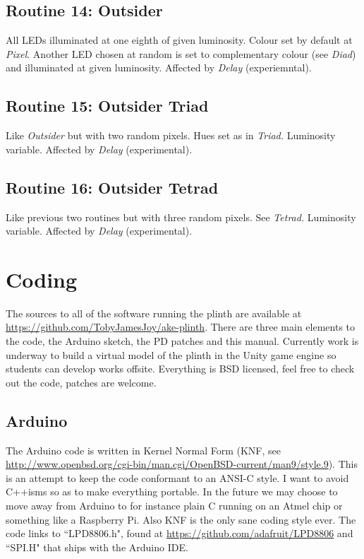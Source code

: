 \documentclass{article}
\begin{document}
	\subsection{Routine 14: Outsider}
	All LEDs illuminated at one eighth of given luminosity. Colour set by 
	default at \emph{Pixel}. Another LED chosen at random is set to 
	complementary colour (see \emph{Diad}) and illuminated at given luminosity. 
	Affected by \emph{Delay} (experiemntal).

	\subsection{Routine 15: Outsider Triad}
	Like \emph{Outsider} but with two random pixels. Hues set as in 
	\emph{Triad.} Luminosity variable. Affected by \emph{Delay} (experimental).

	\subsection{Routine 16: Outsider Tetrad}
	Like previous two routines but with three random pixels. See \emph{Tetrad.} 
	Luminosity variable. Affected by \emph{Delay} (experimental).

	\section{Coding}
	The sources to all of the software running the plinth are available at 
	\url{https://github.com/TobyJamesJoy/ake-plinth}. There are three main 
	elements to the code, the Arduino sketch, the PD patches and this manual. 
	Currently work is underway to build a virtual model of the plinth in the 
	Unity game engine so students can develop works offsite. Everything is BSD 
	licensed, feel free to check out the code, patches are welcome.

	\subsection{Arduino}
	The Arduino code is written in Kernel Normal Form (KNF, see 
	\url{http://www.openbsd.org/cgi-bin/man.cgi/OpenBSD-current/man9/style.9}).
	This is an attempt to keep the code conformant to an ANSI-C style. I want 
	to avoid C++isms so as to make everything portable. In the future we may 
	choose to move away from Arduino to for instance plain C running on an 
	Atmel chip or something like a Raspberry Pi. Also KNF is the only sane 
	coding style ever. The code links to ``LPD8806.h", found at 
	\url{https://github.com/adafruit/LPD8806} and ``SPI.H" that ships with the 
	Arduino IDE.
\end{document}
